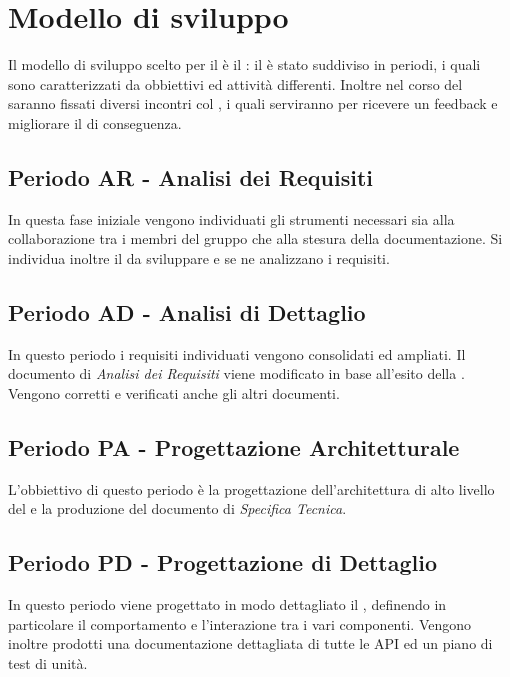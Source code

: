 \documentclass[./PianoDiProgetto.tex]{subfiles}
\begin{document}
  \section{Modello di sviluppo}

  Il modello di sviluppo scelto per il  è il : il
   è stato suddiviso in periodi, i quali sono caratterizzati da
  obbiettivi ed attività differenti. Inoltre nel corso del  saranno
  fissati diversi incontri col , i quali serviranno per ricevere un
  feedback e migliorare il  di conseguenza.

  \subsection{Periodo AR - Analisi dei Requisiti}

  In questa fase iniziale vengono individuati gli strumenti necessari sia alla
  collaborazione tra i membri del gruppo che alla stesura della documentazione.
  Si individua inoltre il  da sviluppare e se ne analizzano i requisiti.

  \subsection{Periodo AD - Analisi di Dettaglio}

  In questo periodo i requisiti individuati vengono consolidati ed ampliati. Il
  documento di \textit{Analisi dei Requisiti} viene modificato in base all'esito
  della \RR. Vengono corretti e verificati anche gli altri documenti.

  \subsection{Periodo PA - Progettazione Architetturale}

  L'obbiettivo di questo periodo è la progettazione dell'architettura di alto
  livello del  e la produzione del documento di \textit{Specifica Tecnica}.

  \subsection{Periodo PD - Progettazione di Dettaglio}

  In questo periodo viene progettato in modo dettagliato il , definendo
  in particolare il comportamento e l'interazione tra i vari componenti. Vengono
  inoltre prodotti una documentazione dettagliata di tutte le API ed un piano
  di test di unità.
\end{document}
